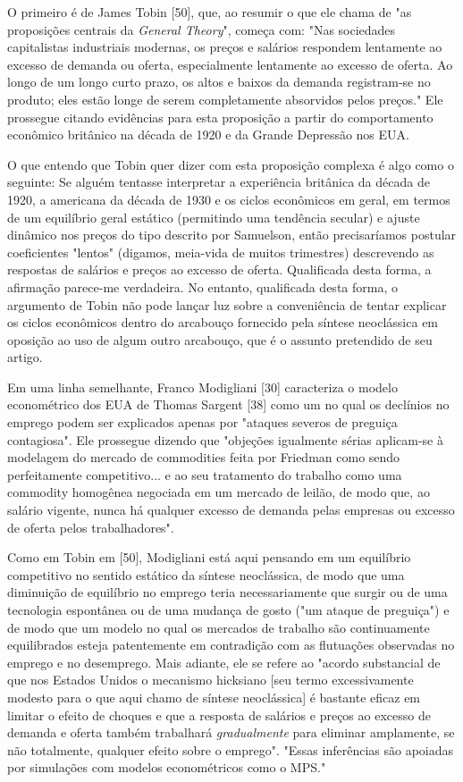 \documentclass[12pt]{article}
\begin{document}
O primeiro é de James Tobin [50], que, ao resumir o que ele chama de "as proposições centrais da \textit{General Theory}", começa com: "Nas sociedades capitalistas industriais modernas, os preços e salários respondem lentamente ao excesso de demanda ou oferta, especialmente lentamente ao excesso de oferta. Ao longo de um longo curto prazo, os altos e baixos da demanda registram-se no produto; eles estão longe de serem completamente absorvidos pelos preços." Ele prossegue citando evidências para esta proposição a partir do comportamento econômico britânico na década de 1920 e da Grande Depressão nos EUA.

O que entendo que Tobin quer dizer com esta proposição complexa é algo como o seguinte: Se alguém tentasse interpretar a experiência britânica da década de 1920, a americana da década de 1930 e os ciclos econômicos em geral, em termos de um equilíbrio geral estático (permitindo uma tendência secular) e ajuste dinâmico nos preços do tipo descrito por Samuelson, então precisaríamos postular coeficientes "lentos" (digamos, meia-vida de muitos trimestres) descrevendo as respostas de salários e preços ao excesso de oferta. Qualificada desta forma, a afirmação parece-me verdadeira. No entanto, qualificada desta forma, o argumento de Tobin não pode lançar luz sobre a conveniência de tentar explicar os ciclos econômicos dentro do arcabouço fornecido pela síntese neoclássica em oposição ao uso de algum outro arcabouço, que é o assunto pretendido de seu artigo.

Em uma linha semelhante, Franco Modigliani [30] caracteriza o modelo econométrico dos EUA de Thomas Sargent [38] como um no qual os declínios no emprego podem ser explicados apenas por "ataques severos de preguiça contagiosa". Ele prossegue dizendo que "objeções igualmente sérias aplicam-se à modelagem do mercado de commodities feita por Friedman como sendo perfeitamente competitivo... e ao seu tratamento do trabalho como uma commodity homogênea negociada em um mercado de leilão, de modo que, ao salário vigente, nunca há qualquer excesso de demanda pelas empresas ou excesso de oferta pelos trabalhadores".

Como em Tobin em [50], Modigliani está aqui pensando em um equilíbrio competitivo no sentido estático da síntese neoclássica, de modo que uma diminuição de equilíbrio no emprego teria necessariamente que surgir ou de uma tecnologia espontânea ou de uma mudança de gosto ("um ataque de preguiça") e de modo que um modelo no qual os mercados de trabalho são continuamente equilibrados esteja patentemente em contradição com as flutuações observadas no emprego e no desemprego. Mais adiante, ele se refere ao "acordo substancial de que nos Estados Unidos o mecanismo hicksiano [seu termo excessivamente modesto para o que aqui chamo de síntese neoclássica] é bastante eficaz em limitar o efeito de choques e que a resposta de salários e preços ao excesso de demanda e oferta também trabalhará \textit{gradualmente} para eliminar amplamente, se não totalmente, qualquer efeito sobre o emprego". "Essas inferências são apoiadas por simulações com modelos econométricos como o MPS."
\end{document}
